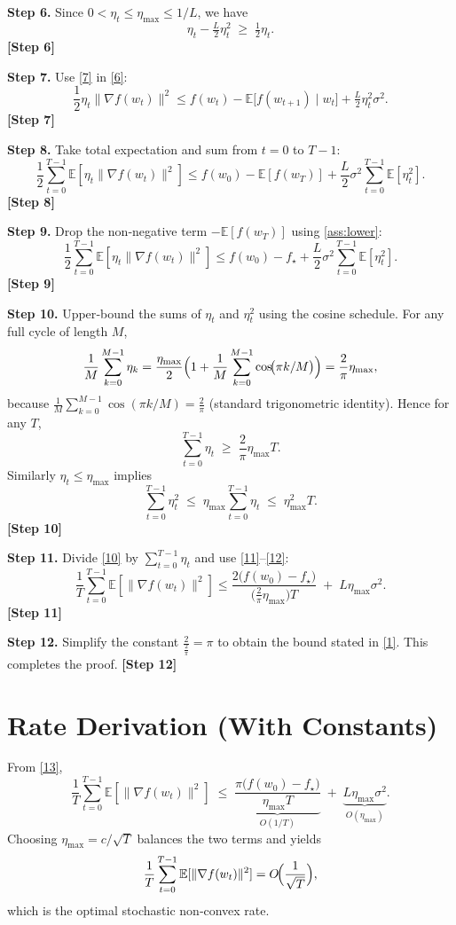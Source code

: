 \documentclass{article}
\newcommand{\E}{\mathbb{E}}
\begin{document}
\noindent\textbf{Step 6.} Since $0<\eta_t\le\eta_{\max}\le 1/L$, we have
\[
\eta_t-\tfrac{L}{2}\eta_t^2\;\ge\;\tfrac{1}{2}\eta_t .
\tag{7}
\] 
\textbf{[Step 6]}

\noindent\textbf{Step 7.} Use \eqref{7} in \eqref{6}:
\[
\frac{1}{2}\eta_t\|\nabla f(w_t)\|^2
\le f(w_t)-\E\big[f(w_{t+1})\mid w_t\big]+\tfrac{L}{2}\eta_t^2\sigma^2 .
\tag{8}
\] 
\textbf{[Step 7]}

\noindent\textbf{Step 8.} Take total expectation and sum from $t=0$ to $T-1$:
\[
\frac{1}{2}\sum_{t=0}^{T-1}\E[\eta_t\|\nabla f(w_t)\|^2]
\le f(w_0)-\E[f(w_T)]+\frac{L}{2}\sigma^2\sum_{t=0}^{T-1}\E[\eta_t^2].
\tag{9}
\] 
\textbf{[Step 8]}

\noindent\textbf{Step 9.} Drop the non‑negative term $-\E[f(w_T)]$ using \ref{ass:lower}:
\[
\frac{1}{2}\sum_{t=0}^{T-1}\E[\eta_t\|\nabla f(w_t)\|^2]
\le f(w_0)-f_\star+\frac{L}{2}\sigma^2\sum_{t=0}^{T-1}\E[\eta_t^2].
\tag{10}
\] 
\textbf{[Step 9]}

\noindent\textbf{Step 10.} Upper‑bound the sums of $\eta_t$ and $\eta_t^2$ using the cosine schedule.
For any full cycle of length $M$,
\[
\frac{1}{M}\sum_{k=0}^{M-1}\eta_{k}
= \frac{\eta_{\max}}{2}\Bigl(1+\frac{1}{M}\sum_{k=0}^{M-1}\cos\!\bigl(\pi k/M\bigr)\Bigr)
= \frac{2}{\pi}\eta_{\max},
\]
because $\frac1M\sum_{k=0}^{M-1}\cos(\pi k/M)=\frac{2}{\pi}$ (standard trigonometric identity). Hence for any $T$,
\[
\sum_{t=0}^{T-1}\eta_t\;\ge\;\frac{2}{\pi}\eta_{\max}T .
\tag{11}
\] 
Similarly $\eta_t\le\eta_{\max}$ implies
\[
\sum_{t=0}^{T-1}\eta_t^2\;\le\; \eta_{\max}\sum_{t=0}^{T-1}\eta_t
\;\le\;\eta_{\max}^2 T .
\tag{12}
\] 
\textbf{[Step 10]}

\noindent\textbf{Step 11.} Divide \eqref{10} by $\sum_{t=0}^{T-1}\eta_t$ and use \eqref{11}–\eqref{12}:
\[
\frac{1}{T}\sum_{t=0}^{T-1}\E[\|\nabla f(w_t)\|^2]
\le
\frac{2\big(f(w_0)-f_\star\big)}{\big(\frac{2}{\pi}\eta_{\max}\big)T}
\;+\;
L\eta_{\max}\sigma^2 .
\tag{13}
\] 
\textbf{[Step 11]}

\noindent\textbf{Step 12.} Simplify the constant $\frac{2}{\frac{2}{\pi}}=\pi$ to obtain the bound stated in \eqref{1}. This completes the proof. \hfill\qedsymbol
\textbf{[Step 12]}

\section*{Rate Derivation (With Constants)}
From \eqref{13},
\[
\frac{1}{T}\sum_{t=0}^{T-1}\E[\|\nabla f(w_t)\|^2]
\;\le\;
\underbrace{\frac{\pi\big(f(w_0)-f_\star\big)}{\eta_{\max}T}}_{\displaystyle O(1/T)}
\;+\;
\underbrace{L\eta_{\max}\sigma^2}_{\displaystyle O(\eta_{\max})}.
\]
Choosing $\eta_{\max}=c/\sqrt{T}$ balances the two terms and yields
\[
\frac{1}{T}\sum_{t=0}^{T-1}\E[\|\nabla f(w_t)\|^2]=O\!\Bigl(\frac{1}{\sqrt{T}}\Bigr),
\]
which is the optimal stochastic non‑convex rate.
\end{document}
